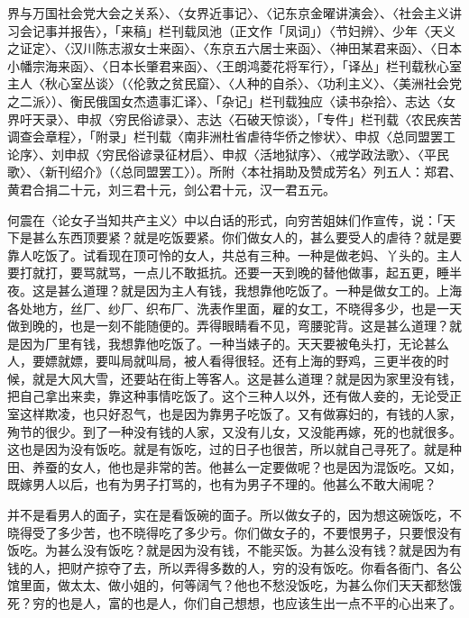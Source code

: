 \noindent 界与万国社会党大会之关系〉、〈女界近事记〉、〈记东京金曜讲演会〉、〈社会主义讲习会记事并报告〉，「来稿」栏刊载凤池（正文作「凤词」）〈节妇辨〉、少年〈天义之证定〉、〈汉川陈志淑女士来函〉、〈东京五六居士来函〉、〈神田某君来函〉、〈日本小幡宗海来函〉、〈日本长肇君来函〉、〈王朗鸿菱花将军行〉，「译丛」栏刊载秋心室主人〈秋心室丛谈〉（〈伦敦之贫民窟〉、〈人种的自杀〉、〈功利主义〉、〈美洲社会党之二派〉）、衡民俄国女杰遗事汇译〉、「杂记」栏刊载独应〈读书杂拾〉、志达〈女界吁天录〉、申叔〈穷民俗谚录〉、志达〈石破天惊谈〉，「专件」栏刊载〈农民疾苦调查会章程〉，「附录」栏刊载〈南非洲杜省虐待华侨之惨状〉、申叔〈总同盟罢工论序〉、刘申叔〈穷民俗谚录征材启〉、申叔〈活地狱序〉、〈戒学政法歌〉、〈平民歌〉、〈新刊绍介》（〈总同盟罢工〉）。所附〈本社捐助及赞成芳名〉列五人：郑君、黄君合捐二十元，刘三君十元，剑公君十元，汉一君五元。

何震在〈论女子当知共产主义〉中以白话的形式，向穷苦姐妹们作宣传，说：「天下是甚么东西顶要紧？就是吃饭要紧。你们做女人的，甚么要受人的虐待？就是要靠人吃饭了。试看现在顶可怜的女人，共总有三种。一种是做老妈、丫头的。主人要打就打，要骂就骂，一点儿不敢抵抗。还要一天到晚的替他做事，起五更，睡半夜。这是甚么道理？就是因为主人有钱，我想靠他吃饭了。一种是做女工的。上海各处地方，丝厂、纱厂、织布厂、洗表作里面，雇的女工，不晓得多少，也是一天做到晚的，也是一刻不能随便的。弄得眼睛看不见，弯腰驼背。这是甚么道理？就是因为厂里有钱，我想靠他吃饭了。一种当婊子的。天天要被龟头打，无论甚么人，要嫖就嫖，要叫局就叫局，被人看得很轻。还有上海的野鸡，三更半夜的时候，就是大风大雪，还要站在街上等客人。这是甚么道理？就是因为家里没有钱，把自己拿出来卖，靠这种事情吃饭了。这个三种人以外，还有做人妾的，无论受正室这样欺凌，也只好忍气，也是因为靠男子吃饭了。又有做寡妇的，有钱的人家，殉节的很少。到了一种没有钱的人家，又没有儿女，又没能再嫁，死的也就很多。这也是因为没有饭吃。就是有饭吃，过的日子也很苦，所以就自己寻死了。就是种田、养蚕的女人，他也是非常的苦。他甚么一定要做呢？也是因为混饭吃。又如，既嫁男人以后，也有为男子打骂的，也有为男子不理的。他甚么不敢大闹呢？


\noindent 并不是看男人的面子，实在是看饭碗的面子。所以做女子的，因为想这碗饭吃，不晓得受了多少苦，也不晓得吃了多少亏。你们做女子的，不要恨男子，只要恨没有饭吃。为甚么没有饭吃？就是因为没有钱，不能买饭。为甚么没有钱？就是因为有钱的人，把财产掠夺了去，所以弄得多数的人，穷的没有饭吃。你看各衙门、各公馆里面，做太太、做小姐的，何等阔气？他也不愁没饭吃，为甚么你们天天都愁饿死？穷的也是人，富的也是人，你们自己想想，也应该生出一点不平的心出来了。

